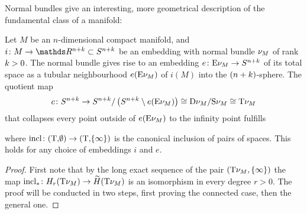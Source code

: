 Normal bundles give an interesting, more geometrical
description of the fundamental class of a manifold:
\begin{Lem}\label{lem:thomisofundcl}
  Let $M$ be an $n$-dimensional compact manifold, and
  $i\colon M\to\R^{n+\rkk}\subset\Sphere{n+\rkk}$ be an embedding with
  normal bundle $\nu_{M}$ of rank $k>0$.
  The normal bundle gives rise to an embedding
  $e\colon \mathrm{E}\nu_{M}\to S^{n+k}$ of its total space
  as a tubular neighbourhood $e(\mathrm{E}\nu_{M})$ of $i(M)$ into the
  $(n+k)$-sphere.
  The quotient map
  \begin{gather*}
    c\colon
    S^{n+k}
    \to S^{n+k}/\left( S^{n+k}\setminus e(\mathrm{E}\nu_{M}) \right)
    \cong \mathrm{D}\nu_{M} / \mathrm{S}\nu_{M}
    \cong \mathrm{T}{\nu_{M}}
  \end{gather*}
  that collapses every point outside of $e(\mathrm{E}\nu_{M})$ to the infinity
  point fulfills
  \begin{center}
  \end{center}
  where $\mathrm{incl}\colon(\mathrm{T}{,}\emptyset)\to(\mathrm{T}{,} \{\infty\})$ is the
  canonical inclusion of pairs of spaces.
  This holds for any choice of embeddings $i$ and $e$.
  \begin{proof}
    First note that by the long exact sequence of the pair 
     $(\mathrm{T}{\nu_{M}}, \{\infty\})$ the map
     ${\mathrm{incl}}_*\colon H_r(\mathrm{T}{\nu_{M}})\to \widetilde{H}(\mathrm{T}{\nu_{M}})$
    is an isomorphism in every degree $r>0$. The proof will be
    conducted in two steps, first proving the connected case, then
    the general one.
    

\end{proof}
\end{Lem}
